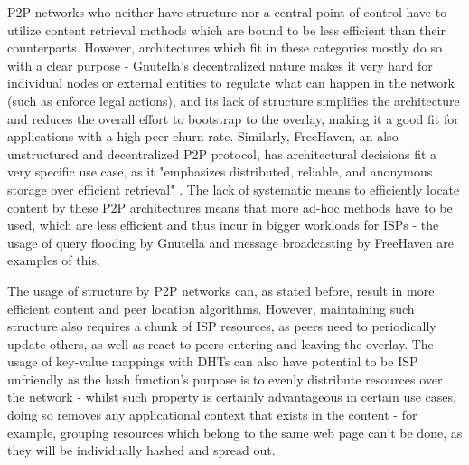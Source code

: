     P2P networks who neither have structure nor a central point of control have to utilize content retrieval methods which are bound to be less efficient than their counterparts.
    However, architectures which fit in these categories mostly do so with a clear purpose - Gnutella's decentralized nature makes it very hard for individual nodes or external entities to regulate what can happen in the network (such as enforce legal actions), and its lack of structure simplifies the architecture and reduces the overall effort to bootstrap to the overlay, making it a good fit for applications with a high peer churn rate.
    Similarly, FreeHaven, an also unstructured and decentralized P2P protocol, has architectural decisions fit a very specific use case, as it "emphasizes distributed, reliable, and anonymous storage over efficient retrieval" \cite{freehaven}.
    The lack of systematic means to efficiently locate content by these P2P architectures means that more ad-hoc methods have to be used, which are less efficient and thus incur in bigger workloads for ISPs - the usage of query flooding by Gnutella and message broadcasting by FreeHaven are examples of this.

    The usage of structure by P2P networks can, as stated before, result in more efficient content and peer location algorithms.
    However, maintaining such structure also requires a chunk of ISP resources, as peers need to periodically update others, as well as react to peers entering and leaving the overlay.
    The usage of key-value mappings with DHTs can also have potential to be ISP unfriendly as the hash function's purpose is to evenly distribute resources over the network - whilst such property is certainly advantageous in certain use cases, doing so removes any  applicational context that exists in the content - for example, grouping resources which belong to the same web page can't be done, as they will be individually hashed and spread out.

